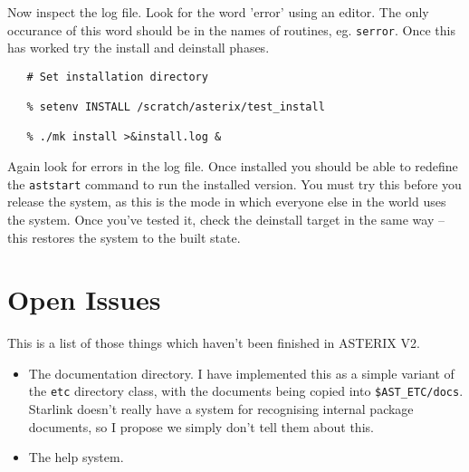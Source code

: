 Now inspect the log file. Look for the word 'error' using an editor. The
only occurance of this word should be in the names of routines, eg.
\verb+serror+.
Once this has worked try the install and deinstall phases.
\begin{verbatim}
   # Set installation directory

   % setenv INSTALL /scratch/asterix/test_install

   % ./mk install >&install.log &
\end{verbatim}
Again look for errors in the log file. Once installed you should be able
to redefine the \verb+aststart+ command to run the installed version. You
must try this before you release the system, as this is the mode in which
everyone else in the world uses the system. Once you've tested it, check
the deinstall target in the same way -- this restores the system to the
built state.


\section{Open Issues}

This is a list of those things which haven't been finished in ASTERIX V2.
\begin{itemize}
\item The documentation directory. I have implemented this as a simple
variant of the \verb+etc+ directory class, with the documents being copied
into \verb+$AST_ETC/docs+. Starlink doesn't really have a system for recognising
internal package documents, so I propose we simply don't tell them about
this.

\item The help system.
\end{itemize}


